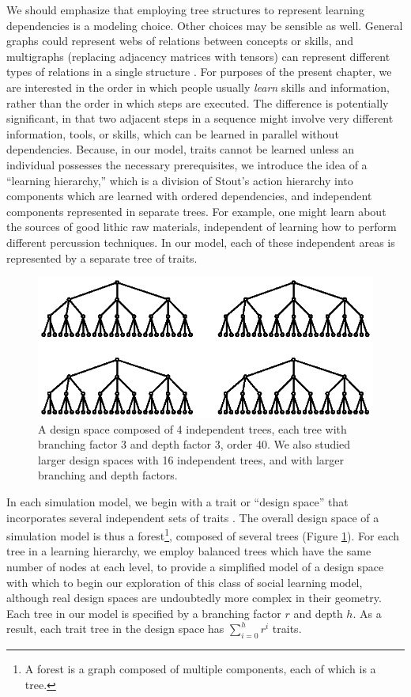 We should emphasize that employing tree structures to represent learning
dependencies is a modeling choice. Other choices may be sensible as
well. General graphs could represent webs of relations between concepts
or skills, and multigraphs (replacing adjacency matrices with tensors)
can represent different types of relations in a single structure
\citep{ICML2011Nickel_438}. For purposes of the present chapter, we are
interested in the order in which people usually \emph{learn} skills and
information, rather than the order in which steps are executed. The
difference is potentially significant, in that two adjacent steps in a
sequence might involve very different information, tools, or skills,
which can be learned in parallel without dependencies. Because, in our
model, traits cannot be learned unless an individual possesses the
necessary prerequisites, we introduce the idea of a ``learning
hierarchy,'' which is a division of Stout's action hierarchy into
components which are learned with ordered dependencies, and independent
components represented in separate trees. For example, one might learn
about the sources of good lithic raw materials, independent of learning
how to perform different percussion techniques. In our model, each of
these independent areas is represented by a separate tree of traits.

\begin{figure}[h] 
\centering 
\includegraphics[scale=0.6]{graphics/semanticaxelrod/design-space-4-trees.eps} 
\caption{A design space composed of 4 independent trees, each tree with branching factor 3 and depth factor 3, order 40.  We also studied larger design spaces with 16 independent trees, and with larger branching and depth factors.} 
\label{img:design-space-4} 
\end{figure}

In each simulation model, we begin with a trait or ``design space'' that
incorporates several independent sets of traits \citep{o2010cultural}.
The overall design space of a simulation model is thus a
forest\footnote{A forest is a graph composed of multiple components,
  each of which is a tree.}, composed of several trees (Figure
\ref{img:design-space-4}). For each tree in a learning hierarchy, we
employ balanced trees which have the same number of nodes at each level,
to provide a simplified model of a design space with which to begin our
exploration of this class of social learning model, although real design
spaces are undoubtedly more complex in their geometry. Each tree in our
model is specified by a branching factor $r$ and depth $h$. As a result,
each trait tree in the design space has $\sum_{i=0}^{h} r^i$ traits.

